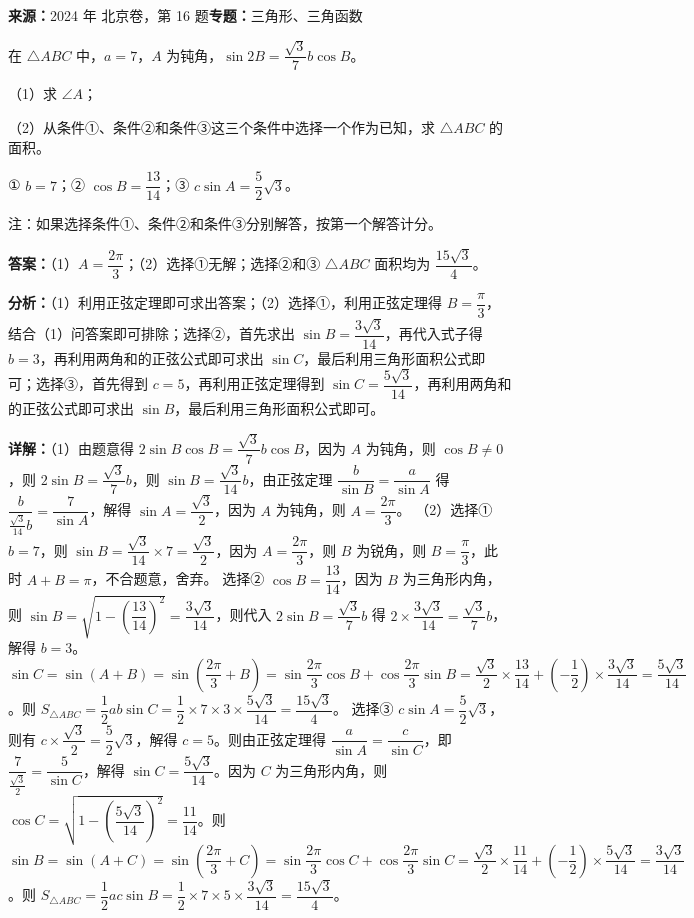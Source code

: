 \begin{question}[points=13]
\textbf{来源：}2024 年 北京卷，第 16 题\quad \textbf{专题：}三角形、三角函数\par
在 $\triangle ABC$ 中，$a=7$，$A$ 为钝角，$\sin 2B = \dfrac{\sqrt{3}}{7} b \cos B$。

（1）求 $\angle A$；

（2）从条件①、条件②和条件③这三个条件中选择一个作为已知，求 $\triangle ABC$ 的面积。

① $b=7$；② $\cos B = \dfrac{13}{14}$；③ $c\sin A = \dfrac{5}{2}\sqrt{3}$。

注：如果选择条件①、条件②和条件③分别解答，按第一个解答计分。
\begin{solution}
\textbf{答案：}（1）$A=\dfrac{2\pi}{3}$；（2）选择①无解；选择②和③ $\triangle ABC$ 面积均为 $\dfrac{15\sqrt{3}}{4}$。

\textbf{分析：}（1）利用正弦定理即可求出答案；（2）选择①，利用正弦定理得 $B=\dfrac{\pi}{3}$，结合（1）问答案即可排除；选择②，首先求出 $\sin B = \dfrac{3\sqrt{3}}{14}$，再代入式子得 $b=3$，再利用两角和的正弦公式即可求出 $\sin C$，最后利用三角形面积公式即可；选择③，首先得到 $c=5$，再利用正弦定理得到 $\sin C = \dfrac{5\sqrt{3}}{14}$，再利用两角和的正弦公式即可求出 $\sin B$，最后利用三角形面积公式即可。

\textbf{详解：}（1）由题意得 $2\sin B \cos B = \dfrac{\sqrt{3}}{7} b \cos B$，因为 $A$ 为钝角，则 $\cos B \neq 0$，则 $2\sin B = \dfrac{\sqrt{3}}{7} b$，则 $\sin B = \dfrac{\sqrt{3}}{14} b$，由正弦定理 $\dfrac{b}{\sin B} = \dfrac{a}{\sin A}$ 得 $\dfrac{b}{\frac{\sqrt{3}}{14}b} = \dfrac{7}{\sin A}$，解得 $\sin A = \dfrac{\sqrt{3}}{2}$，因为 $A$ 为钝角，则 $A = \dfrac{2\pi}{3}$。
（2）选择① $b=7$，则 $\sin B = \dfrac{\sqrt{3}}{14} \times 7 = \dfrac{\sqrt{3}}{2}$，因为 $A=\dfrac{2\pi}{3}$，则 $B$ 为锐角，则 $B = \dfrac{\pi}{3}$，此时 $A+B = \pi$，不合题意，舍弃。
选择② $\cos B = \dfrac{13}{14}$，因为 $B$ 为三角形内角，则 $\sin B = \sqrt{1-\left(\dfrac{13}{14}\right)^2} = \dfrac{3\sqrt{3}}{14}$，则代入 $2\sin B = \dfrac{\sqrt{3}}{7} b$ 得 $2\times \dfrac{3\sqrt{3}}{14} = \dfrac{\sqrt{3}}{7} b$，解得 $b=3$。$\sin C = \sin(A+B) = \sin\left(\dfrac{2\pi}{3}+B\right) = \sin\dfrac{2\pi}{3}\cos B + \cos\dfrac{2\pi}{3}\sin B = \dfrac{\sqrt{3}}{2}\times\dfrac{13}{14} + \left(-\dfrac{1}{2}\right)\times\dfrac{3\sqrt{3}}{14} = \dfrac{5\sqrt{3}}{14}$。则 $S_{\triangle ABC} = \dfrac{1}{2}ab\sin C = \dfrac{1}{2}\times7\times3\times\dfrac{5\sqrt{3}}{14} = \dfrac{15\sqrt{3}}{4}$。
选择③ $c\sin A = \dfrac{5}{2}\sqrt{3}$，则有 $c\times\dfrac{\sqrt{3}}{2} = \dfrac{5}{2}\sqrt{3}$，解得 $c=5$。则由正弦定理得 $\dfrac{a}{\sin A} = \dfrac{c}{\sin C}$，即 $\dfrac{7}{\frac{\sqrt{3}}{2}} = \dfrac{5}{\sin C}$，解得 $\sin C = \dfrac{5\sqrt{3}}{14}$。因为 $C$ 为三角形内角，则 $\cos C = \sqrt{1-\left(\dfrac{5\sqrt{3}}{14}\right)^2} = \dfrac{11}{14}$。则 $\sin B = \sin(A+C) = \sin\left(\dfrac{2\pi}{3}+C\right) = \sin\dfrac{2\pi}{3}\cos C + \cos\dfrac{2\pi}{3}\sin C = \dfrac{\sqrt{3}}{2}\times\dfrac{11}{14} + \left(-\dfrac{1}{2}\right)\times\dfrac{5\sqrt{3}}{14} = \dfrac{3\sqrt{3}}{14}$。则 $S_{\triangle ABC} = \dfrac{1}{2}ac\sin B = \dfrac{1}{2}\times7\times5\times\dfrac{3\sqrt{3}}{14} = \dfrac{15\sqrt{3}}{4}$。
\end{solution}
\end{question}

